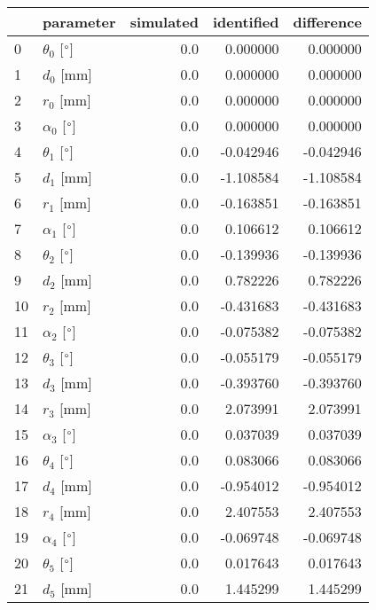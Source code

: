 \documentclass{standalone}%
\begin{document}
%
\normalsize%
\begin{tabular}{llrrr}
\toprule
{} &                 parameter & simulated & identified & difference \\
\midrule
0  &  $\theta_{0}$ [$\degree$] &       0.0 &   0.000000 &   0.000000 \\
1  &              $d_{0}$ [mm] &       0.0 &   0.000000 &   0.000000 \\
2  &              $r_{0}$ [mm] &       0.0 &   0.000000 &   0.000000 \\
3  &  $\alpha_{0}$ [$\degree$] &       0.0 &   0.000000 &   0.000000 \\
4  &  $\theta_{1}$ [$\degree$] &       0.0 &  -0.042946 &  -0.042946 \\
5  &              $d_{1}$ [mm] &       0.0 &  -1.108584 &  -1.108584 \\
6  &              $r_{1}$ [mm] &       0.0 &  -0.163851 &  -0.163851 \\
7  &  $\alpha_{1}$ [$\degree$] &       0.0 &   0.106612 &   0.106612 \\
8  &  $\theta_{2}$ [$\degree$] &       0.0 &  -0.139936 &  -0.139936 \\
9  &              $d_{2}$ [mm] &       0.0 &   0.782226 &   0.782226 \\
10 &              $r_{2}$ [mm] &       0.0 &  -0.431683 &  -0.431683 \\
11 &  $\alpha_{2}$ [$\degree$] &       0.0 &  -0.075382 &  -0.075382 \\
12 &  $\theta_{3}$ [$\degree$] &       0.0 &  -0.055179 &  -0.055179 \\
13 &              $d_{3}$ [mm] &       0.0 &  -0.393760 &  -0.393760 \\
14 &              $r_{3}$ [mm] &       0.0 &   2.073991 &   2.073991 \\
15 &  $\alpha_{3}$ [$\degree$] &       0.0 &   0.037039 &   0.037039 \\
16 &  $\theta_{4}$ [$\degree$] &       0.0 &   0.083066 &   0.083066 \\
17 &              $d_{4}$ [mm] &       0.0 &  -0.954012 &  -0.954012 \\
18 &              $r_{4}$ [mm] &       0.0 &   2.407553 &   2.407553 \\
19 &  $\alpha_{4}$ [$\degree$] &       0.0 &  -0.069748 &  -0.069748 \\
20 &  $\theta_{5}$ [$\degree$] &       0.0 &   0.017643 &   0.017643 \\
21 &              $d_{5}$ [mm] &       0.0 &   1.445299 &   1.445299 \\

\end{tabular}
\end{document}
